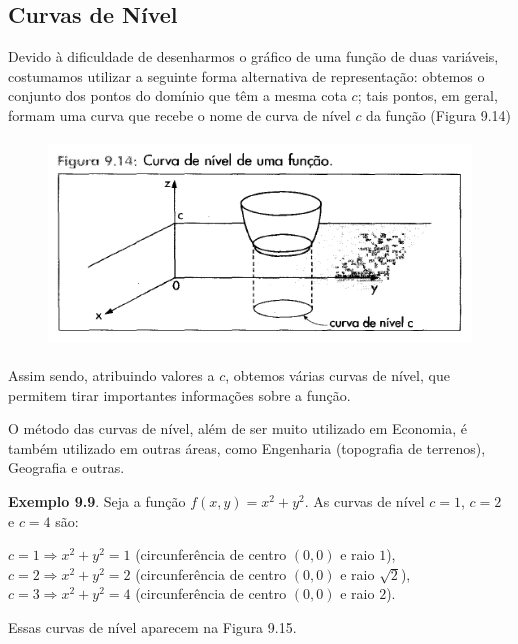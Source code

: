 			\subsection{Curvas de Nível \cite{morettin}}

		Devido à dificuldade de desenharmos o gráfico de uma função de duas variáveis, costumamos utilizar a seguinte forma alternativa de representação: obtemos o conjunto dos pontos do domínio que têm a mesma cota $c$; tais pontos, em geral, formam uma curva que recebe o nome de curva de nível $c$ da função (Figura 9.14)

		\begin{figure}[H]
			\includegraphics[height=5.5cm]{images/morettin_figura-9-14}
		\end{figure}

		Assim sendo, atribuindo valores a $c$, obtemos várias curvas de nível, que permitem tirar importantes informações sobre a função.

		O método das curvas de nível, além de ser muito utilizado em Economia, é também utilizado em outras áreas, como Engenharia (topografia de terrenos), Geografia e outras.

		\bigskip

		\textbf{Exemplo 9.9}. Seja a função $f(x, y) = x^{2} + y^{2}$. As curvas de nível $c = 1$, $c = 2$ e $c = 4$ são:

		\bigskip

		$c = 1 \Rightarrow x^{2} + y^{2} = 1$ (circunferência de centro $(0, 0)$ e raio $1$), \\
		$c = 2 \Rightarrow x^{2} + y^{2} = 2$ (circunferência de centro $(0, 0)$ e raio $\sqrt{2}$), \\
		$c = 3 \Rightarrow x^{2} + y^{2} = 4$ (circunferência de centro $(0, 0)$ e raio $2$).

		\bigskip

		Essas curvas de nível aparecem na Figura 9.15.

